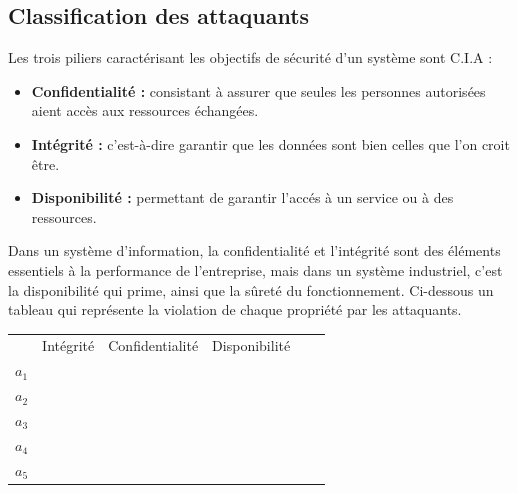 \documentclass[10pt,a4paper]{article}
\newcommand{\cmark}{\ding{51}}%
\newcommand{\xmark}{\ding{55}}%
\begin{document}
\subsection{Classification des attaquants}
Les trois piliers caractérisant les objectifs de sécurité d'un système sont C.I.A :
\begin{itemize}
 \item \textbf{Confidentialité :} consistant à assurer que seules les personnes autorisées aient accès aux ressources échangées.
 \item \textbf{Intégrité :} c'est-à-dire garantir que les données sont bien celles que l'on croit \^{e}tre.
 \item \textbf{Disponibilité :} permettant de garantir l'accés à un service ou à des ressources.   
 \end{itemize} 
Dans un système d'information, la confidentialité et l'intégrité sont des éléments essentiels à la performance de l'entreprise, mais dans un système industriel, c'est la disponibilité qui prime, ainsi que la s\^{u}reté du fonctionnement. Ci-dessous un tableau qui représente la violation de chaque propriété par les attaquants.  
\begin{table}[!h]
\centering
\begin{tabular}{llllll}
\cline{2-4}
\multicolumn{1}{l|}{}  & \multicolumn{1}{l|}{Intégrité} & \multicolumn{1}{l|}{Confidentialité} & \multicolumn{1}{l|}{Disponibilité} &  &  \\ \cline{1-4}
\multicolumn{1}{|l|}{$a_1$} & \multicolumn{1}{c|}{\color{green}{\cmark}} & \multicolumn{1}{c|}{\color{green}{\cmark}} & \multicolumn{1}{c|}{\color{green}{\cmark}} &  &  \\ \cline{1-4}
\multicolumn{1}{|l|}{$a_2$} & \multicolumn{1}{c|}{\color{green}{\cmark}} & \multicolumn{1}{c|}{\color{green}{\cmark}} & \multicolumn{1}{c|}{\color{red}{\xmark}} &  &  \\ \cline{1-4}
\multicolumn{1}{|l|}{$a_3$} & \multicolumn{1}{c|}{\color{green}{\cmark}} & \multicolumn{1}{c|}{\color{red}{\xmark}} & \multicolumn{1}{c|}{\color{red}{\xmark}} &  &  \\ \cline{1-4}
\multicolumn{1}{|l|}{$a_4$} & \multicolumn{1}{c|}{\color{green}{\cmark}} & \multicolumn{1}{c|}{\color{red}{\xmark}} & \multicolumn{1}{c|}{\color{red}{\xmark}} &  &  \\ \cline{1-4}
\multicolumn{1}{|l|}{$a_5$} & \multicolumn{1}{c|}{\color{red}{\xmark}} & \multicolumn{1}{c|}{\color{red}{\xmark}} & \multicolumn{1}{c|}{\color{green}{\cmark}} &  &  \\ \cline{1-4}
\end{tabular}
\end{table}
\end{document}
